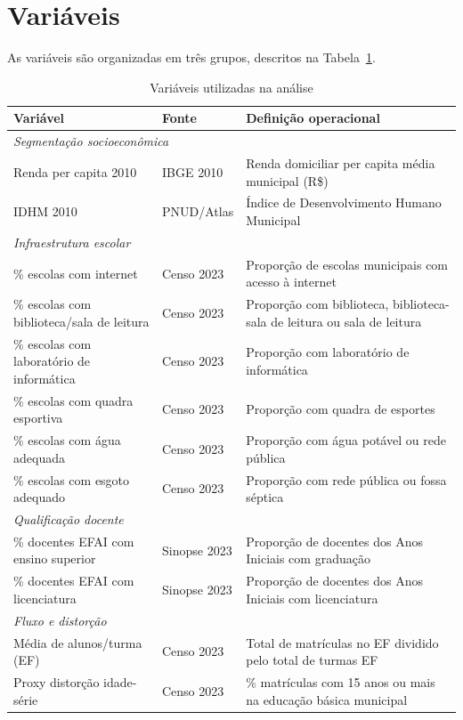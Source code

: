 \section{Variáveis}

As variáveis são organizadas em três grupos, descritos na Tabela~\ref{tab:variaveis}.

\begin{table}[H]
\centering
\caption{Variáveis utilizadas na análise}
\label{tab:variaveis}
\begin{tabular}{p{5.5cm} p{2.5cm} p{6cm}}
\toprule
\textbf{Variável} & \textbf{Fonte} & \textbf{Definição operacional} \\
\midrule
\multicolumn{3}{l}{\textit{Segmentação socioeconômica}} \\
Renda per capita 2010 & IBGE 2010 & Renda domiciliar per capita média municipal (R\$) \\
IDHM 2010 & PNUD/Atlas & Índice de Desenvolvimento Humano Municipal \\
\midrule
\multicolumn{3}{l}{\textit{Infraestrutura escolar}} \\
\% escolas com internet & Censo 2023 & Proporção de escolas municipais com acesso à internet \\
\% escolas com biblioteca/sala de leitura & Censo 2023 & Proporção com biblioteca, biblioteca-sala de leitura ou sala de leitura \\
\% escolas com laboratório de informática & Censo 2023 & Proporção com laboratório de informática \\
\% escolas com quadra esportiva & Censo 2023 & Proporção com quadra de esportes \\
\% escolas com água adequada & Censo 2023 & Proporção com água potável ou rede pública \\
\% escolas com esgoto adequado & Censo 2023 & Proporção com rede pública ou fossa séptica \\
\midrule
\multicolumn{3}{l}{\textit{Qualificação docente}} \\
\% docentes EFAI com ensino superior & Sinopse 2023 & Proporção de docentes dos Anos Iniciais com graduação \\
\% docentes EFAI com licenciatura & Sinopse 2023 & Proporção de docentes dos Anos Iniciais com licenciatura \\
\midrule
\multicolumn{3}{l}{\textit{Fluxo e distorção}} \\
Média de alunos/turma (EF) & Censo 2023 & Total de matrículas no EF dividido pelo total de turmas EF \\
Proxy distorção idade-série & Censo 2023 & \% matrículas com 15 anos ou mais na educação básica municipal \\
\bottomrule
\end{tabular}
\end{table}

